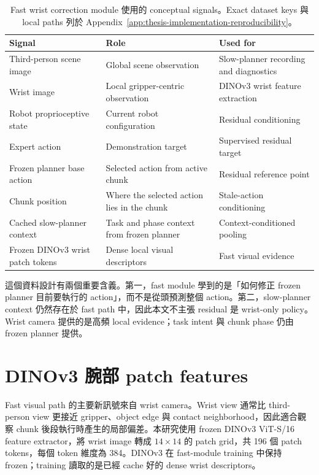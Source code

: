 \begin{table}[htbp]
  \centering
  \caption{Fast wrist correction module 使用的 conceptual signals。Exact dataset keys 與 local paths 列於 Appendix~\ref{app:thesis-implementation-reproducibility}。}
  \label{tab:conceptual_signals}
  \begin{tabular}{p{}p{}p{}}
    \toprule
    Signal & Role & Used for \\
    \midrule
    Third-person scene image & Global scene observation & Slow-planner recording and diagnostics \\
    Wrist image & Local gripper-centric observation & DINOv3 wrist feature extraction \\
    Robot proprioceptive state & Current robot configuration & Residual conditioning \\
    Expert action & Demonstration target & Supervised residual target \\
    Frozen planner base action & Selected action from active chunk & Residual reference point \\
    Chunk position & Where the selected action lies in the chunk & Stale-action conditioning \\
    Cached slow-planner context & Task and phase context from frozen planner & Context-conditioned pooling \\
    Frozen DINOv3 wrist patch tokens & Dense local visual descriptors & Fast visual evidence \\
    \bottomrule
  \end{tabular}
\end{table}

這個資料設計有兩個重要含義。第一，fast module 學到的是「如何修正 frozen planner 目前要執行的 action」，而不是從頭預測整個 action。第二，slow-planner context 仍然存在於 fast path 中，因此本文不主張 residual 是 wrist-only policy。Wrist camera 提供的是高頻 local evidence；task intent 與 chunk phase 仍由 frozen planner 提供。

\section{DINOv3 腕部 patch features}

Fast visual path 的主要新訊號來自 wrist camera。Wrist view 通常比 third-person view 更接近 gripper、object edge 與 contact neighborhood，因此適合觀察 chunk 後段執行時產生的局部偏差。本研究使用 frozen DINOv3 ViT-S/16 feature extractor，將 wrist image 轉成 $14\times14$ 的 patch grid，共 196 個 patch tokens，每個 token 維度為 384。DINOv3 在 fast-module training 中保持 frozen；training 讀取的是已經 cache 好的 dense wrist descriptors。

